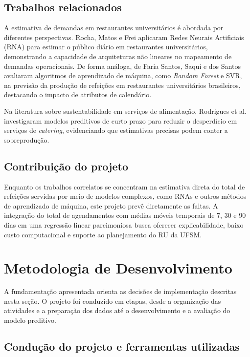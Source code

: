 \documentclass[11pt,a4paper]{article}
\begin{document}
\subsection{Trabalhos relacionados}

A estimativa de demandas em restaurantes universitários é abordada por diferentes perspectivas. Rocha, Matos e Frei \cite{rocha2011utilizaccao} aplicaram Redes Neurais Artificiais (RNA) para estimar o público diário em restaurantes universitários, demonstrando a capacidade de arquiteturas não lineares no mapeamento de demandas operacionais. De forma análoga, de Faria Santos, Saqui e dos Santos \cite{de2021metodo} avaliaram algoritmos de aprendizado de máquina, como \textit{Random Forest} e SVR, na previsão da produção de refeições em restaurantes universitários brasileiros, destacando o impacto de atributos de calendário.

Na literatura sobre sustentabilidade em serviços de alimentação, Rodrigues et al. \cite{rodrigues2024machine} investigaram modelos preditivos de curto prazo para reduzir o desperdício em serviços de \textit{catering}, evidenciando que estimativas precisas podem conter a sobreprodução.

\subsection{Contribuição do projeto}

Enquanto os trabalhos correlatos se concentram na estimativa direta do total de refeições servidas por meio de modelos complexos, como RNAs e outros métodos de aprendizado de máquina, este projeto prevê diretamente as faltas. A integração do total de agendamentos com médias móveis temporais de 7, 30 e 90 dias em uma regressão linear parcimoniosa busca oferecer explicabilidade, baixo custo computacional e suporte ao planejamento do RU da UFSM.

\section{Metodologia de Desenvolvimento}

A fundamentação apresentada orienta as decisões de implementação descritas nesta seção. O projeto foi conduzido em etapas, desde a organização das atividades e a preparação dos dados até o desenvolvimento e a avaliação do modelo preditivo.

\subsection{Condução do projeto e ferramentas utilizadas}
\end{document}
